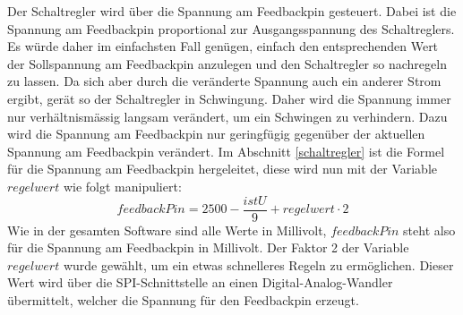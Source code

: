 Der Schaltregler wird über die Spannung am Feedbackpin gesteuert. Dabei ist die Spannung am Feedbackpin proportional zur Ausgangsspannung des Schaltreglers. Es würde daher im einfachsten Fall genügen, einfach den entsprechenden Wert der Sollspannung am Feedbackpin anzulegen und den Schaltregler so nachregeln zu lassen. Da sich aber durch die veränderte Spannung auch ein anderer Strom ergibt, gerät so der Schaltregler in Schwingung. Daher wird die Spannung immer nur verhältnismässig langsam verändert, um ein Schwingen zu verhindern. Dazu wird die Spannung am Feedbackpin nur geringfügig gegenüber der aktuellen Spannung am Feedbackpin verändert. Im Abschnitt \ref{schaltregler} ist die Formel für die Spannung am Feedbackpin hergeleitet, diese wird nun mit der Variable $regelwert$ wie folgt manipuliert:
\begin{equation}
	feedbackPin=2500-\frac{istU}{9}+regelwert\cdot2
\label{eq:feedbackpin}
\end{equation}
Wie in der gesamten Software sind alle Werte in Millivolt, $feedbackPin$ steht also für die Spannung am Feedbackpin in Millivolt. Der Faktor 2 der Variable $regelwert$ wurde gewählt, um ein etwas schnelleres Regeln zu ermöglichen. Dieser Wert wird über die SPI-Schnittstelle an einen Digital-Analog-Wandler übermittelt, welcher die Spannung für den Feedbackpin erzeugt.



%
%
